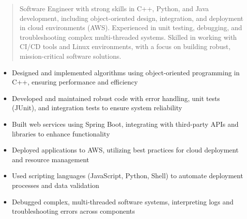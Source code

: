 



\makecvheader

\begin{quote}
  \noindent
  Software Engineer with strong skills in C++, Python, and Java development, including object-oriented design, integration, and deployment in cloud environments (AWS). Experienced in unit testing, debugging, and troubleshooting complex multi-threaded systems. Skilled in working with CI/CD tools and Linux environments, with a focus on building robust, mission-critical software solutions.
\end{quote}

\par\smallskip
\noindent
\begin{minipage}{20cm}
  \begin{minipage}{9.75cm}
    \begin{itemize}
      \item Designed and implemented algorithms using object-oriented programming in C++, ensuring performance and efficiency
      \item Developed and maintained robust code with error handling, unit tests (JUnit), and integration tests to ensure system reliability
      \item Built web services using Spring Boot, integrating with third-party APIs and libraries to enhance functionality
    \end{itemize}
  \end{minipage}
  \hfill
  \begin{minipage}{9.75cm}
    \begin{itemize}
      \item Deployed applications to AWS, utilizing best practices for cloud deployment and resource management
      \item Used scripting languages (JavaScript, Python, Shell) to automate deployment processes and data validation
      \item Debugged complex, multi-threaded software systems, interpreting logs and troubleshooting errors across components
    \end{itemize}
  \end{minipage}
\end{minipage}
\par\smallskip
\divider

